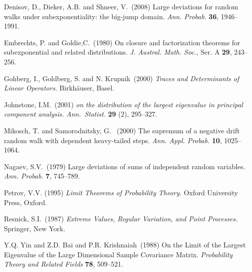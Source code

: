 \documentclass[11pt,reqno]{amsart}
\newcommand{\1}{\mathds{1}}
\newcommand{\0}{\boldsymbol{0}}
\newcommand{\4}{\mathchoice{\mskip1.5mu}{\mskip1.5mu}{}{}}
\newcommand{\5}{\mathchoice{\mskip-1.5mu}{\mskip-1.5mu}{}{}}
\newcommand{\2}{\penalty250\mskip\thickmuskip\mskip-\thinmuskip} %
\begin{document}
\begin{thebibliography}{99}
{\sc Denisov, D., Dieker, A.B. and Shneer, V.}\ (2008)
Large deviations for random walks under subexponentiality:
the big-jump domain.
{\em Ann. Probab.} {\bf 36}, 1946--1991.


{\sc Embrechts, P. and Goldie,C.}\ (1980)
On closure and factorization theorems for subexponential and related
distributions. {\em J. Austral. Math. Soc.,} Ser. A {\bf 29}, 243--256.



{\sc Gohberg, I., Goldberg, S. and N. Krupnik}\ (2000)
{\em Traces and Determinants of Linear Operators.} Birkh\"auser, Basel.

{\sc Johnstone, I.M.}\ (2001)
{\em on the distribution of the largest eigenvalue in principal component analysis.} {\em Ann.~Statist.} {\bf 29} (2), 295--327.


{\sc Mikosch, T. and Samorodnitsky, G.} \ (2000)
The supremum of a negative drift random walk with
dependent heavy-tailed steps. {\em Ann. Appl. Probab.} {\bf 10}, 1025--1064.


{\sc Nagaev, S.V.}\ (1979)
Large deviations of sums of independent random
variables.
{\em Ann. Probab.} {\bf 7}, 745--789.


{\sc Petrov, V.V.} (1995)
{\em Limit Theorems of Probability Theory.} Oxford University Press,
Oxford.


{\sc Resnick, S.I.}\ (1987)
{\em Extreme Values, Regular Variation, and Point Processes.}
Sprin\-ger, New York.

{\sc Y.Q. Yin and Z.D. Bai and P.R. Krishnaiah}\ (1988)
On the Limit of the Largest Eigenvalue of the Large Dimensional Sample
Covariance Matrix.
{\em Probability Theory and Related Fields} {\bf 78}, 509--521.


\end{thebibliography}
\end{document}
